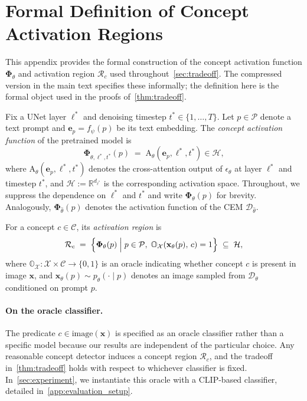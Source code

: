 \section{Formal Definition of Concept Activation Regions}
\label{app:concept_regions}
This appendix provides the formal construction of the concept activation function $\boldsymbol{\Phi}_\theta$ and activation region $\mathcal{R}_c$ used throughout~\cref{sec:tradeoff}. The compressed version in the main text specifies these informally; the definition here is the formal object used in the proofs of~\cref{thm:tradeoff}.

\begin{definition}
\label{def:activation}
Fix a UNet layer $\ell^*$ and denoising timestep $t^* \in \{1,\ldots,T\}$. Let $p \in \mathcal{P}$ denote a text prompt and $\mathbf{e}_p = f_\psi(p)$ be its text embedding. The \emph{concept activation function} of the pretrained model is
\begin{equation}
    \boldsymbol{\Phi}_{\theta, \ell^*,t^*}(p) \;=\; \mathrm{A}_{\theta}(\mathbf{e}_p,\ell^*,t^*) \in \mathcal{H},
\end{equation}
where $\mathrm{A}_{\theta}(\mathbf{e}_p, \ell^*, t^*)$ denotes the cross-attention output 
of $\epsilon_\theta$ at layer $\ell^*$ and timestep $t^*$, and $\mathcal{H} := \mathbb{R}^{d_{\ell^*}}$ is the corresponding activation space. 
Throughout, we suppress the dependence on $\ell^*$ 
and $t^*$ and write $\boldsymbol{\Phi}_\theta(p)$ for brevity.
Analogously, $\boldsymbol{\Phi}_{\hat{\theta}}(p)$ denotes the activation function of the CEM $\mathcal{D}_{\hat\theta}$.

For a concept $c \in \mathcal{C}$, its \emph{activation region} is
\begin{equation}
    \mathcal{R}_c
    \;=\;
    \Bigl\{
        \boldsymbol{\Phi}_{\theta}(p)
        \;\Big|\;
        p \in \mathcal{P},\;
        \mathbb{O}_{\mathcal{X}}\!\left(\mathbf{x}_{\theta}(p),\, c\right) = 1
    \Bigr\}
    \;\subseteq\; \mathcal{H},
\end{equation}
where $\mathbb{O}_{\mathcal{X}} : \mathcal{X} \times \mathcal{C} \to \{0,1\}$ is an oracle indicating whether concept $c$ is present in image $\mathbf{x}$, and $\mathbf{x}_{\theta}(p) \sim p_{\theta}(\cdot \mid p)$ denotes an image sampled from $\mathcal{D}_\theta$ conditioned on prompt $p$.
\end{definition}

\paragraph{On the oracle classifier.}
The predicate $c \in \text{image}(\mathbf{x})$ is specified as an oracle classifier rather than a specific model because our results are independent of the particular choice. Any reasonable concept detector induces a concept region $\mathcal{R}_c$, and the tradeoff in~\cref{thm:tradeoff} holds with respect to whichever classifier is fixed. In~\cref{sec:experiment}, we instantiate this oracle with a CLIP-based classifier, detailed in~\cref{app:evaluation_setup}. 